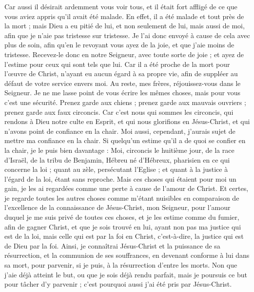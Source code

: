 \begin{multicols}{2}
Car aussi il désirait ardemment vous voir tous, et il était fort affligé de ce que vous aviez appris qu'il avait été malade.
En effet, il a été malade et tout près de la mort ; mais Dieu a eu pitié de lui, et non seulement de lui, mais aussi de moi, afin que je n'aie pas tristesse sur tristesse.
Je l'ai donc envoyé à cause de cela avec plus de soin, afin qu'en le revoyant vous ayez de la joie, et que j'aie moins de tristesse.
Recevez-le donc en notre Seigneur, avec toute sorte de joie ; et ayez de l'estime pour ceux qui sont tels que lui. 
Car il a été proche de la mort pour l'œuvre de Christ, n'ayant eu aucun égard à sa propre vie, afin de suppléer au défaut de votre service envers moi.
\VerseOne{}Au reste, mes frères, réjouissez-vous dans le Seigneur. Je ne me lasse point de vous écrire les mêmes choses, mais pour vous c'est une sécurité.
Prenez garde aux chiens ; prenez garde aux mauvais ouvriers ; prenez garde aux faux circoncis.
Car c'est nous qui sommes les circoncis, qui rendons à Dieu notre culte en Esprit, et qui nous glorifions en Jésus-Christ, et qui n'avons point de confiance en la chair.
Moi aussi, cependant, j'aurais sujet de mettre ma confiance en la chair. Si quelqu'un estime qu'il a de quoi se confier en la chair, je le puis bien davantage :
Moi, circoncis le huitième jour, de la race d'Israël, de la tribu de Benjamin, Hébreu né d'Hébreux, pharisien en ce qui concerne la loi ;
quant au zèle, persécutant l'Eglise ; et quant à la justice à l'égard de la loi, étant sans reproche.
Mais ces choses qui étaient pour moi un gain, je les ai regardées comme une perte à cause de l'amour de Christ.
Et certes, je regarde toutes les autres choses comme m'étant nuisibles en comparaison de l'excellence de la connaissance de Jésus-Christ, mon Seigneur, pour l'amour duquel je me suis privé de toutes ces choses, et je les estime comme du fumier, afin de gagner Christ,
et que je sois trouvé en lui, ayant non pas ma justice qui est de la loi, mais celle qui est par la foi en Christ, c'est-à-dire, la justice qui est de Dieu par la foi.
Ainsi, je connaîtrai Jésus-Christ et la puissance de sa résurrection, et la communion de ses souffrances, en devenant conforme à lui dans sa mort, pour parvenir,
si je puis, à la résurrection d'entre les morts.
Non que j'aie déjà atteint le but, ou que je sois déjà rendu parfait, mais je poursuis ce but pour tâcher d'y parvenir ; c'est pourquoi aussi j'ai été pris par Jésus-Christ.

\end{multicols}
